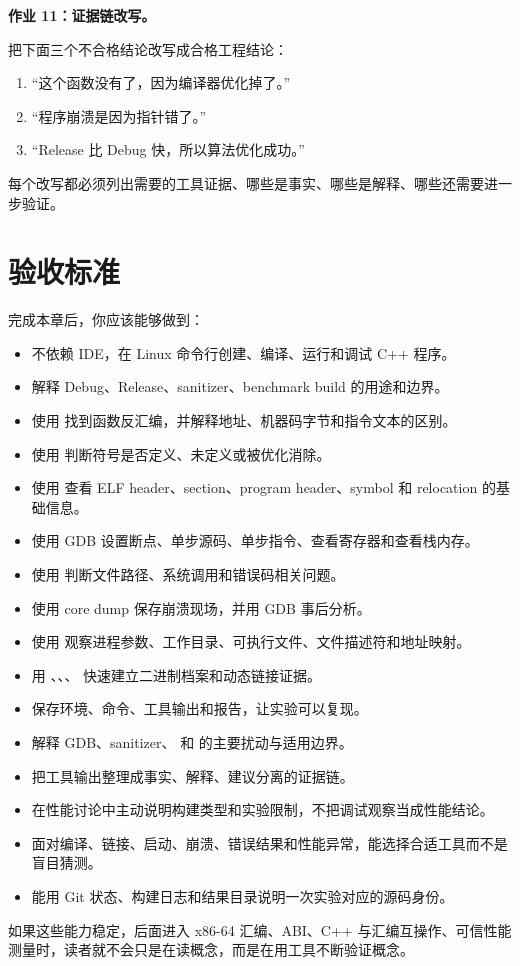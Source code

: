 \begin{exercisebox}
\textbf{作业 11：证据链改写。}

把下面三个不合格结论改写成合格工程结论：

\begin{enumerate}
  \item “这个函数没有了，因为编译器优化掉了。”
  \item “程序崩溃是因为指针错了。”
  \item “Release 比 Debug 快，所以算法优化成功。”
\end{enumerate}

每个改写都必须列出需要的工具证据、哪些是事实、哪些是解释、哪些还需要进一步验证。
\end{exercisebox}

\section{验收标准}

完成本章后，你应该能够做到：

\begin{itemize}
  \item 不依赖 IDE，在 Linux 命令行创建、编译、运行和调试 C++ 程序。
  \item 解释 Debug、Release、sanitizer、benchmark build 的用途和边界。
  \item 使用  找到函数反汇编，并解释地址、机器码字节和指令文本的区别。
  \item 使用  判断符号是否定义、未定义或被优化消除。
  \item 使用  查看 ELF header、section、program header、symbol 和 relocation 的基础信息。
  \item 使用 GDB 设置断点、单步源码、单步指令、查看寄存器和查看栈内存。
  \item 使用  判断文件路径、系统调用和错误码相关问题。
  \item 使用 core dump 保存崩溃现场，并用 GDB 事后分析。
  \item 使用  观察进程参数、工作目录、可执行文件、文件描述符和地址映射。
  \item 用 、、、 快速建立二进制档案和动态链接证据。
  \item 保存环境、命令、工具输出和报告，让实验可以复现。
  \item 解释 GDB、sanitizer、 和  的主要扰动与适用边界。
  \item 把工具输出整理成事实、解释、建议分离的证据链。
  \item 在性能讨论中主动说明构建类型和实验限制，不把调试观察当成性能结论。
  \item 面对编译、链接、启动、崩溃、错误结果和性能异常，能选择合适工具而不是盲目猜测。
  \item 能用 Git 状态、构建日志和结果目录说明一次实验对应的源码身份。
\end{itemize}

如果这些能力稳定，后面进入 x86-64 汇编、ABI、C++ 与汇编互操作、可信性能测量时，读者就不会只是在读概念，而是在用工具不断验证概念。
